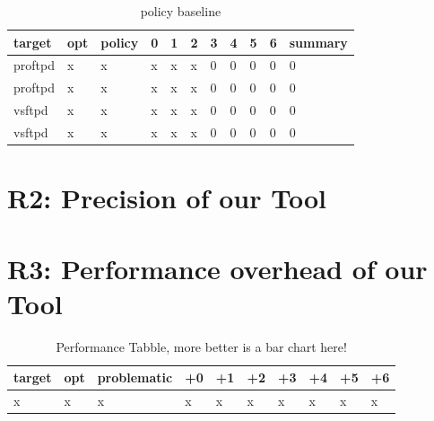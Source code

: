 \begin{table}[H]
\centering
\caption{policy baseline}
\label{matching}
\begin{tabular}{|l|l|l|l|l|l|l|l|l|l|l|} \hline
\textbf{target}  & \textbf{opt}     & \textbf{policy} & \textbf{0}    &\textbf{1} & \textbf{2}  & \textbf{3} &\textbf{4} & \textbf{5} &\textbf{6}  &\textbf{summary} \\ \hline 
proftpd          &x                 &x                &x              &x          &x            &0           &0          &0           &0           &0     \\ \hline
proftpd          &x                 &x                &x              &x          &x            &0           &0          &0           &0           &0      \\ \hline
vsftpd           &x                 &x                &x              &x          &x            &0           &0          &0           &0           &0      \\ \hline
vsftpd           &x                 &x                &x              &x          &x            &0           &0          &0           &0           &0      \\ \hline

\end{tabular}
\end{table}


\section{R2: Precision of our Tool}

\section{R3: Performance overhead of our Tool}
\begin{table}[H]
\centering
\caption{Performance Tabble, more better is a bar chart here!}
\label{Integer overflow bug detection in CWE-190}
\begin{tabular}{|l|l|l|l|l|l|l|l|l|l|} \hline
\textbf{target}  & \textbf{opt}     & \textbf{problematic}    &\textbf{+0} & \textbf{+1}  & \textbf{+2} &\textbf{+3} &\textbf{+4} &\textbf{+5} &\textbf{+6}  \\ \hline 
x                &x                 &x                        &x           &x             &x            &x           &x           &x           &x            \\ \hline

\end{tabular}
\end{table}
